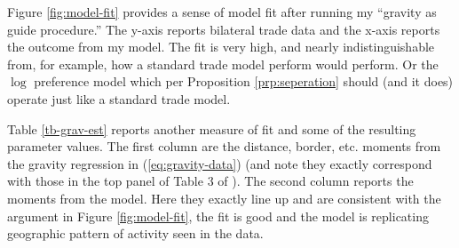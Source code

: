 \documentclass[12pt,pdftex]{article}
\begin{document}
\begin{onehalfspacing}
Figure \ref{fig:model-fit} provides a sense of model fit after running my ``gravity as guide procedure.'' The y-axis reports bilateral trade data and the x-axis reports the outcome from my model. The fit is very high, and nearly indistinguishable from, for example, how a standard trade model perform would perform. Or the $\log$ preference model which per Proposition \ref{prp:seperation} should (and it does) operate just like a standard trade model.

Table \ref{tb-grav-est} reports another measure of fit and some of the resulting parameter values. The first column are the distance, border, etc. moments from the gravity regression in (\ref{eq:gravity-data}) (and note they exactly correspond with those in the top panel of Table 3 of \citet{eaton2002technology}). The second column reports the moments from the model. Here they exactly line up and are consistent with the argument in Figure \ref{fig:model-fit}, the fit is good and the model is replicating geographic pattern of activity seen in the data.


\end{onehalfspacing}
\end{document}
